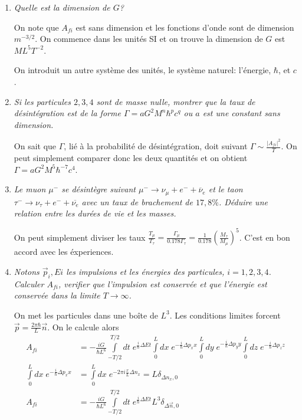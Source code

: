 \documentclass[10pt]{report}
\newcommand{\abs}[1]{\left|#1\right|}
\begin{document}
\begin{enumerate}[1.]
    \item \emph{Quelle est la dimension de $G$?}

        On note que $A_{fi}$ est sans dimension et les fonctions d'onde sont de dimension $m^{-3/2}$. On commence dans les unit\'es SI et on trouve la dimension de $G$ est $ML^5T^{-2}$.

        On introduit un autre syst\`eme des unit\'es, le syst\`eme naturel: l'\'energie, $\hbar$, et $c$. 
    \item \emph{Si les particules $2,3,4$ sont de masse nulle, montrer que la taux de d\'esint\'egration est de la forme $\Gamma = aG^2 M^n\hbar^pc^q$ ou $a$ est une constant sans dimension.}

        On sait que $\Gamma$, li\'e \`a la probabilit\'e de d\'esint\'egration, doit suivant $\Gamma \sim \frac{\abs{A_{fi}}^2}{T}$. On peut simplement comparer donc les deux quantit\'es et on obtient $\Gamma = aG^2M^5\hbar^{-7}c^4$.
    \item \emph{Le muon $\mu^-$ se d\'esint\`egre suivant $\mu^- \to \nu_\mu + e^- + \overline{\nu}_e$ et le taon $\tau^- \to \nu_\tau +e^- +\overline{\nu_e}$ avec un taux de brachement de $17,8\%$. D\'eduire une relation entre les dur\'ees de vie et les masses.}

        On peut simplement diviser les taux $\frac{T_\mu}{T_\tau} = \frac{\Gamma_\mu}{0.178 \Gamma_\tau} = \frac{1}{0.178}\left( \frac{M_\tau}{M_\mu} \right)^5$. C'est en bon accord avec les \'experiences. 

    \item \emph{Notons $\vec{p}_i, Ei$ les impulsions et les \'energies des particules, $i = 1,2,3,4$. Calculer $A_{fi}$, verifier que l'impulsion est conserv\'ee et que l'\'energie est conserv\'ee dans la limite $T \to \infty$.}

        On met les particules dans une bo\^ite de $L^3$. Les conditions limites forcent $\vec{p} = \frac{2\pi \hbar}{L}\vec{n}$. On le calcule alors
        \begin{align}
            A_{fi} &= -\frac{iG}{\hbar L^6}\int\limits_{-T/2}^{T/2}dt\;e^{\frac{i}{\hbar}\Delta Et} \int\limits_{0}^{L}dx\;e^{-\frac{i}{\hbar}\Delta p_xx}\int\limits_{0}^{L}dy\;e^{-\frac{i}{\hbar}\Delta p_yy}\int\limits_{0}^{L}dz\;e^{-\frac{i}{\hbar}\Delta p_zz}\\
            \int\limits_{0}^{L}dx\;e^{-\frac{i}{\hbar}\Delta p_xx} &= \int\limits_{0}^{L}dx\;e^{-2\pi i \frac{x}{L}\Delta n_x} = L\delta_{\Delta n_x, 0}\\
            A_{fi} &= -\frac{iG}{\hbar L^6}\int\limits_{-T/2}^{T/2}dt\;e^{\frac{i}{\hbar}\Delta Et} L^3\delta_{\Delta \vec{n},0}
        \end{align}


\end{enumerate}
\end{document}
